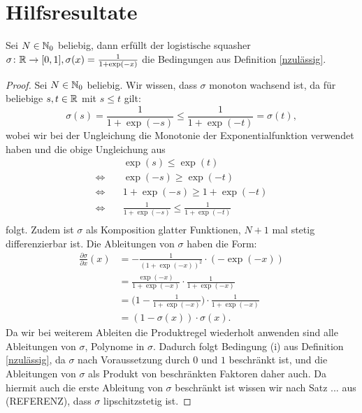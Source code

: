 \section{Hilfsresultate}
\begin{lem}
\label{lem:logsquasher}
Sei $N \in \mathbb{N}_0$ beliebig, dann erfüllt der logistische squasher $\sigma\colon \mathbb{R} \to [0, 1], \sigma(x) = \frac{1}{1 + \exp(-x)}$ die Bedingungen aus Definition \ref{nzulässig}.  
\end{lem}
\begin{proof}
Sei $N \in \mathbb{N}_0$ beliebig. Wir wissen, dass $\sigma$ monoton wachsend ist, da für beliebige $s, t \in \mathbb{R}$ mit $s \leq t$ gilt:
$$\sigma(s) = \frac{1}{1 + \exp(-s)} \leq \frac{1}{1 + \exp(-t)} = \sigma(t),$$
wobei wir bei der Ungleichung die Monotonie der Exponentialfunktion verwendet haben und die obige Ungleichung aus
\begin{equation*}
\begin{split}
& \quad \exp(s) \leq \exp(t) \\
 \Leftrightarrow & \quad \exp(-s) \geq \exp(-t) \\
 \Leftrightarrow & \quad 1 + \exp(-s) \geq 1 + \exp(-t) \\
 \Leftrightarrow & \quad \frac{1}{1 + \exp(-s)} \leq \frac{1}{1 + \exp(-t)} \\
\end{split}
\end{equation*}
folgt. Zudem ist $\sigma$ als Komposition glatter Funktionen, $N + 1$ mal stetig differenzierbar ist. Die Ableitungen von $\sigma$ haben die Form$\colon$
\begin{equation*}
\begin{split}
\frac{\partial \sigma}{\partial x}(x) &= -\frac{1}{(1 + \exp(-x))^2} \cdot (-\exp(-x)) \\
& = \frac{\exp(-x)}{1 + \exp(-x)} \cdot \frac{1}{1 + \exp(-x)} \\
& = \bigg(1 - \frac{1}{1 + \exp(-x)}\bigg) \cdot \frac{1}{1 + \exp(-x)} \\
& = (1 - \sigma(x)) \cdot \sigma(x).
\end{split}
\end{equation*}
Da wir bei weiterem Ableiten die Produktregel wiederholt anwenden sind alle Ableitungen von $\sigma$, Polynome in $\sigma$. Dadurch folgt Bedingung (i) aus Definition \ref{nzulässig}, da $\sigma$ nach Voraussetzung durch $0$ und $1$ beschränkt ist, und die Ableitungen von $\sigma$ als Produkt von beschränkten Faktoren daher auch. Da hiermit auch die erste Ableitung von $\sigma$ beschränkt ist wissen wir nach Satz ... aus (REFERENZ), dass $\sigma$ lipschitzstetig ist.


\end{proof}
